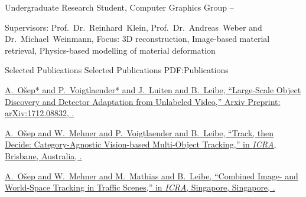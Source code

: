 \documentclass[letterpaper,MMMyyyy,nonstopmode]{simpleresumecv}
\begin{document}
\begin{Body}
\Gap
\BulletItem
Undergraduate Research Student, Computer Graphics Group
\hfill
{} --
\begin{Detail}
\SubBulletItem
Supervisors:
Prof.~Dr.~Reinhard~Klein,
Prof.~Dr.~Andreas~Weber and
Dr.~Michael~Weinmann,
\SubBulletItem
Focus:
3D reconstruction, Image-based material retrieval, Physics-based modelling of material deformation
\end{Detail}


\Section
{Selected Publications}
{Selected Publications}
{PDF:Publications}

%
%
%
\begingroup
\Gap
\href{https://arxiv.org/abs/1712.08832}
{\underline{A.~O\v{s}ep}* and P.~Voigtlaender* and J.~Luiten and B.~Leibe,
``Large-Scale Object Discovery and Detector Adaptation from Unlabeled Video,''
Arxiv Preprint:	arXiv:1712.08832,  
.}

\Gap
\href{https://arxiv.org/pdf/1712.07920.pdf}
{\underline{A.~Ošep} and W.~Mehner and P.~Voigtlaender and B.~Leibe,
``Track, then Decide: Category-Agnostic Vision-based Multi-Object Tracking,''
in \textit{ICRA},
Brisbane, Australia,
.}

\Gap
\href{https://www.vision.rwth-aachen.de/media/papers/paper_final_compressed.pdf}
{\underline{A.~Ošep} and W.~Mehner and M.~Mathias and B.~Leibe,
``Combined Image- and World-Space Tracking in Traffic Scenes,''
in \textit{ICRA},
Singapore, Singapore,
.}


\end{Body}
\end{document}
